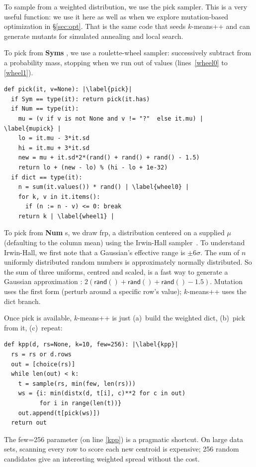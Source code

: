\documentclass[AMA,STIX2COL]{WileyNJDv5}
\newcommand{\cls}[1]{%
  \setlength{\fboxsep}{1.5pt}%
  \colorbox{clsbg}{\sffamily\bfseries{#1}}%
}
\begin{document}
{To sample from a weighted distribution, we use the  
\textsf{pick} sampler. This is a very useful function: we use 
it here as well as when we explore
mutation-based optimization in \S\ref{sec:opt}.
That is  the same code that seeds $k$-means++ and can 
generate mutants for simulated annealing and local search. 

 To pick from \cls{Syms}, we use a 
roulette-wheel sampler: successively subtract from a probability mass,
stopping when we run out of values
 (lines~\ref{wheel0} to \ref{wheel1}).
\begin{verbatim}
def pick(it, v=None): |\label{pick}|
  if Sym == type(it): return pick(it.has)
  if Num == type(it):
    mu = (v if v is not None and v != "?"  else it.mu) | \label{mupick} |
    lo = it.mu - 3*it.sd
    hi = it.mu + 3*it.sd
    new = mu + it.sd*2*(rand() + rand() + rand() - 1.5)
    return lo + (new - lo) % (hi - lo + 1e-32)
  if dict == type(it):
    n = sum(it.values()) * rand() | \label{wheel0} |
    for k, v in it.items():
      if (n := n - v) <= 0: break
    return k | \label{wheel1} |
\end{verbatim}
To pick from \cls{Num}s, we draw  frp,  a distribution centered on a supplied $\mu$ (defaulting to
the column mean) using the Irwin-Hall
sampler~\cite{johnson1995continuous}. 
To understand Irwin-Hall, we first note that a Gaussian's effective range is
$\pm 6\sigma$. The sum of $n$ uniformly distributed random numbers is approximately
normally distributed. So the sum of three uniforms, centred and
scaled, is a fast way to generate a Gaussian approximation : $2(\textsf{rand}() + \textsf{rand}() + \textsf{rand}() -
1.5)$. Mutation uses the first form (perturb around
a specific row's value); $k$-means++ uses the dict branch.

 
Once \textsf{pick} is available, $k$-means++ is just (a)~build
the weighted dict, (b)~pick from it, (c)~repeat:

\begin{verbatim}
def kpp(d, rs=None, k=10, few=256): |\label{kpp}|
  rs = rs or d.rows
  out = [choice(rs)]
  while len(out) < k:
    t = sample(rs, min(few, len(rs)))
    ws = {i: min(distx(d, t[i], c)**2 for c in out)
          for i in range(len(t))}
    out.append(t[pick(ws)])
  return out
\end{verbatim}
The \textsf{few=256} parameter  (on line \ref{kpp}) is a pragmatic shortcut. On large
data sets, scanning every row to score each new centroid is
expensive; 256 random candidates give an interesting weighted
spread without the cost.

}
\end{document}
